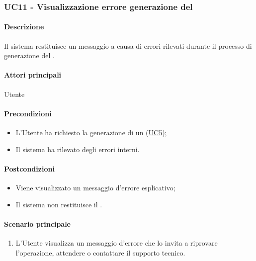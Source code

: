 \subsubsection{UC11 - Visualizzazione errore generazione del }\label{UC11}
\paragraph*{Descrizione}
Il sistema restituisce un messaggio a causa di errori rilevati durante il processo di generazione del .

\paragraph*{Attori principali}
Utente

\paragraph*{Precondizioni}
\begin{itemize}
  \item L'Utente ha richiesto la generazione di un  (\hyperref[UC5]{UC5});
  \item Il sistema ha rilevato degli errori interni. 
\end{itemize}

\paragraph*{Postcondizioni}
\begin{itemize}
  \item Viene visualizzato un messaggio d'errore esplicativo;
  \item Il sistema non restituisce il .
\end{itemize}

\paragraph*{Scenario principale}
\begin{enumerate}
  \item L'Utente visualizza un messaggio d'errore che lo invita a riprovare l'operazione, attendere o contattare il supporto tecnico.
\end{enumerate}
